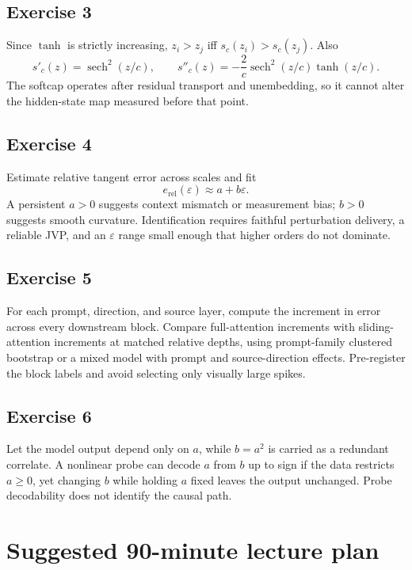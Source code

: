\documentclass[11pt]{article}
\newcommand{\eps}{\varepsilon}
\theoremstyle{definition}
\theoremstyle{remark}
\begin{document}
\subsection*{Exercise 3}
Since $\tanh$ is strictly increasing, $z_i>z_j$ iff $s_c(z_i)>s_c(z_j)$. Also
\[
  s'_c(z)=\operatorname{sech}^2(z/c),
  \qquad
  s''_c(z)=-\frac{2}{c}\operatorname{sech}^2(z/c)\tanh(z/c).
\]
The softcap operates after residual transport and unembedding, so it cannot alter the hidden-state map measured before that point.

\subsection*{Exercise 4}
Estimate relative tangent error across scales and fit
\[
  e_{\mathrm{rel}}(\eps)\approx a+b\eps.
\]
A persistent $a>0$ suggests context mismatch or measurement bias; $b>0$ suggests smooth curvature. Identification requires faithful perturbation delivery, a reliable JVP, and an $\eps$ range small enough that higher orders do not dominate.

\subsection*{Exercise 5}
For each prompt, direction, and source layer, compute the increment in error across every downstream block. Compare full-attention increments with sliding-attention increments at matched relative depths, using prompt-family clustered bootstrap or a mixed model with prompt and source-direction effects. Pre-register the block labels and avoid selecting only visually large spikes.

\subsection*{Exercise 6}
Let the model output depend only on $a$, while $b=a^2$ is carried as a redundant correlate. A nonlinear probe can decode $a$ from $b$ up to sign if the data restricts $a\ge0$, yet changing $b$ while holding $a$ fixed leaves the output unchanged. Probe decodability does not identify the causal path.

\section{Suggested 90-minute lecture plan}
\end{document}
